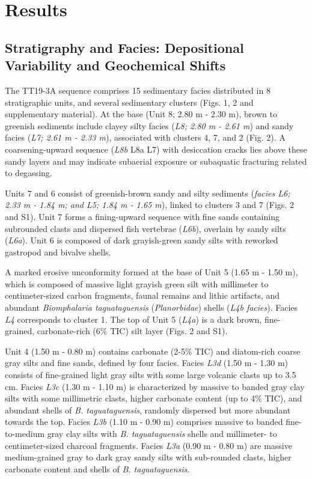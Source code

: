 \documentclass[
]{article}
\begin{document}
\section{Results}\label{results}

\subsection{Stratigraphy and Facies: Depositional Variability and
Geochemical
Shifts}\label{stratigraphy-and-facies-depositional-variability-and-geochemical-shifts}

The TT19-3A sequence comprises 15 sedimentary facies distributed in 8
stratigraphic units, and several sedimentary clusters (Figs. 1, 2 and
supplementary material). At the base (Unit 8; 2.80 m - 2.30 m), brown to
greenish sediments include clayey silty facies (\emph{L8; 2.80 m - 2.61
m}) and sandy facies (\emph{L7; 2.61 m - 2.33 m}), associated with
clusters 4, 7, and 2 (Fig. 2). A coarsening-upward sequence (\emph{L8b}
\rightarrow L8a \rightarrow L7) with desiccation cracks lies above these
sandy layers and may indicate subaerial exposure or subaquatic
fracturing related to degassing.

Units 7 and 6 consist of greenish-brown sandy and silty sediments
(\emph{facies L6; 2.33 m - 1.84 m; and L5; 1.84 m - 1.65 m}), linked to
clusters 3 and 7 (Figs. 2 and S1). Unit 7 forms a fining-upward sequence
with fine sands containing subrounded clasts and dispersed fish
vertebrae (\emph{L6b}), overlain by sandy silts (\emph{L6a}). Unit 6 is
composed of dark grayish-green sandy silts with reworked gastropod and
bivalve shells.

A marked erosive unconformity formed at the base of Unit 5 (1.65 m -
1.50 m), which is composed of massive light grayish green silt with
millimeter to centimeter-sized carbon fragments, faunal remains and
lithic artifacts, and abundant \emph{Biomphalaria taguataguensis}
(\emph{Planorbidae}) shells (\emph{L4b facies}). Facies \emph{L4}
corresponds to cluster 1. The top of Unit 5 (\emph{L4a}) is a dark
brown, fine-grained, carbonate-rich (6\% TIC) silt layer (Figs. 2 and
S1).

Unit 4 (1.50 m - 0.80 m) contains carbonate (2-5\% TIC) and diatom-rich
coarse gray silts and fine sands, defined by four facies. Facies
\emph{L3d} (1.50 m - 1.30 m) consists of fine-grained light gray silts
with some large volcanic clasts up to 3.5 cm. Facies \emph{L3c} (1.30 m
- 1.10 m) is characterized by massive to banded gray clay silts with
some millimetric clasts, higher carbonate content (up to 4\% TIC), and
abundant shells of \emph{B. taguataguensis}, randomly dispersed but more
abundant towards the top. Facies \emph{L3b} (1.10 m - 0.90 m) comprises
massive to banded fine-to-medium gray clay silts with \emph{B.
taguataguensis} shells and millimeter- to centimeter-sized charcoal
fragments. Facies \emph{L3a} (0.90 m - 0.80 m) are massive
medium-grained gray to dark gray sandy silts with sub-rounded clasts,
higher carbonate content and shells of \emph{B. taguataguensis}.
\end{document}
